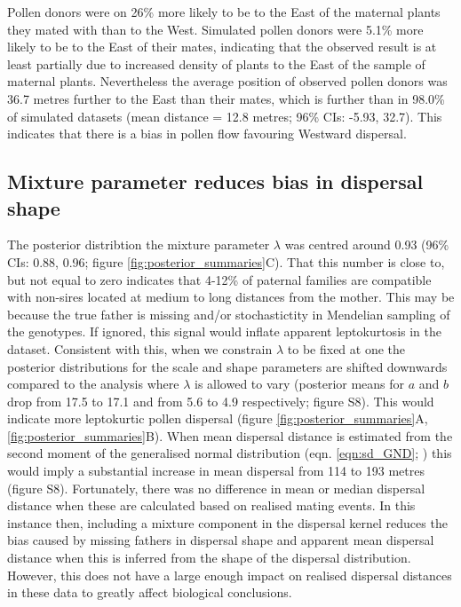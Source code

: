 \documentclass[10pt, a4paper, twocolumn]{article} %
\begin{document}
Pollen donors were on 26\% more likely to be to the East of the maternal plants they mated with than to the West.
Simulated pollen donors were 5.1\% more likely to be to the East of their mates, indicating that the observed result is at least partially due to increased density of plants to the East of the sample of maternal plants.
Nevertheless the average position of observed pollen donors was 36.7 metres further to the East than their mates, which is further than in 98.0\% of simulated datasets (mean distance = 12.8 metres; 96\% CIs: -5.93, 32.7).
This indicates that there is a bias in pollen flow favouring Westward dispersal.

\subsection{Mixture parameter reduces bias in dispersal shape}

The posterior distribtion the mixture parameter $\lambda$ was centred around 0.93 (96\% CIs: 0.88, 0.96; figure \ref{fig:posterior_summaries}C).
That this number is close to, but not equal to zero indicates that 4-12\% of paternal families are compatible with non-sires located at medium to long distances from the mother.
This may be because the true father is missing and/or stochastictity in Mendelian sampling of the genotypes.
If ignored, this signal would inflate apparent leptokurtosis in the dataset.
Consistent with this, when we constrain $\lambda$ to be fixed at one the posterior distributions for the scale and shape parameters are shifted downwards compared to the analysis where $\lambda$ is allowed to vary (posterior means for $a$ and $b$ drop from 17.5 to 17.1 and from 5.6 to 4.9 respectively; figure S8).
This would indicate more leptokurtic pollen dispersal (figure \ref{fig:posterior_summaries}A, \ref{fig:posterior_summaries}B).
When mean dispersal distance is estimated from the second moment of the generalised normal distribution (eqn. \ref{eqn:sd_GND}; \cite{clark1998trees}) this would imply a substantial increase in mean dispersal from 114 to 193 metres (figure S8).
Fortunately, there was no difference in mean or median dispersal distance when these are calculated based on realised mating events.
In this instance then, including a mixture component in the dispersal kernel reduces the bias caused by missing fathers in dispersal shape and apparent mean dispersal distance when this is inferred from the shape of the dispersal distribution.
However, this does not have a large enough impact on realised dispersal distances in these data to greatly affect biological conclusions.
\end{document}
